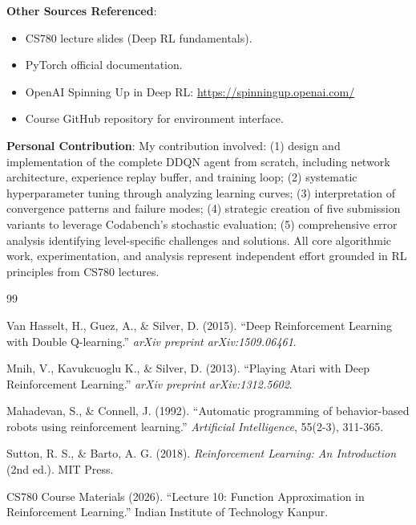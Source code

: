 \documentclass[12pt,a4paper]{article}
\begin{document}
\textbf{Other Sources Referenced}:
\begin{itemize}
    \item CS780 lecture slides (Deep RL fundamentals).
    \item PyTorch official documentation.
    \item OpenAI Spinning Up in Deep RL: \url{https://spinningup.openai.com/}
    \item Course GitHub repository for environment interface.
\end{itemize}

\textbf{Personal Contribution}:
My contribution involved: (1) design and implementation of the complete DDQN agent from scratch, including network architecture, experience replay buffer, and training loop; (2) systematic hyperparameter tuning through analyzing learning curves; (3) interpretation of convergence patterns and failure modes; (4) strategic creation of five submission variants to leverage Codabench's stochastic evaluation; (5) comprehensive error analysis identifying level-specific challenges and solutions. All core algorithmic work, experimentation, and analysis represent independent effort grounded in RL principles from CS780 lectures.

\newpage

\begin{thebibliography}{99}

Van Hasselt, H., Guez, A., \& Silver, D. (2015).
``Deep Reinforcement Learning with Double Q-learning.''
\textit{arXiv preprint arXiv:1509.06461}.

Mnih, V., Kavukcuoglu K., \& Silver, D. (2013).
``Playing Atari with Deep Reinforcement Learning.''
\textit{arXiv preprint arXiv:1312.5602}.

Mahadevan, S., \& Connell, J. (1992).
``Automatic programming of behavior-based robots using reinforcement learning.''
\textit{Artificial Intelligence}, 55(2-3), 311-365.

Sutton, R. S., \& Barto, A. G. (2018).
\textit{Reinforcement Learning: An Introduction} (2nd ed.).
MIT Press.

CS780 Course Materials (2026).
``Lecture 10: Function Approximation in Reinforcement Learning.''
Indian Institute of Technology Kanpur.

\end{thebibliography}
\end{document}
